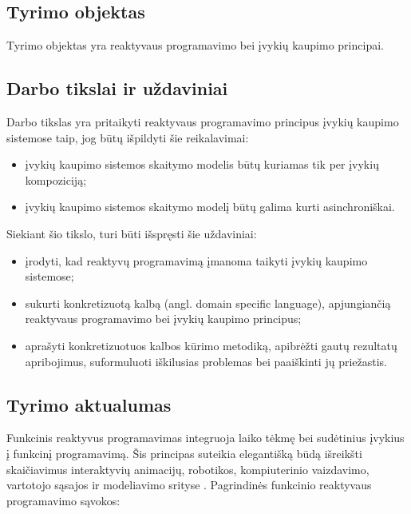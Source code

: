 \subsection{Tyrimo objektas}

    Tyrimo objektas yra reaktyvaus programavimo bei įvykių kaupimo principai.

\subsection{Darbo tikslai ir uždaviniai}

    Darbo tikslas yra pritaikyti reaktyvaus programavimo principus įvykių kaupimo sistemose taip, jog būtų išpildyti šie reikalavimai:

\begin{itemize}

    \item įvykių kaupimo sistemos skaitymo modelis būtų kuriamas tik per įvykių kompoziciją;

    \item įvykių kaupimo sistemos skaitymo modelį būtų galima kurti asinchroniškai.

\end{itemize}

    Siekiant šio tikslo, turi būti išspręsti šie uždaviniai:

\begin{itemize}
        \item įrodyti, kad reaktyvų programavimą įmanoma taikyti įvykių kaupimo sistemose;
        \item sukurti konkretizuotą kalbą (angl. domain specific language), apjungiančią reaktyvaus programavimo bei įvykių kaupimo principus;
        \item aprašyti konkretizuotuos kalbos kūrimo metodiką, apibrėžti gautų rezultatų apribojimus, suformuluoti iškilusias problemas bei paaiškinti jų priežastis.
\end{itemize}

\subsection{Tyrimo aktualumas}

    Funkcinis reaktyvus programavimas integruoja laiko tėkmę bei sudėtinius įvykius į funkcinį programavimą. Šis principas suteikia elegantišką būdą išreikšti skaičiavimus interaktyvių animacijų, robotikos, kompiuterinio vaizdavimo, vartotojo sąsajos ir modeliavimo srityse \cite[p. 4]{ELM:FRP}. Pagrindinės funkcinio reaktyvaus programavimo sąvokos:


